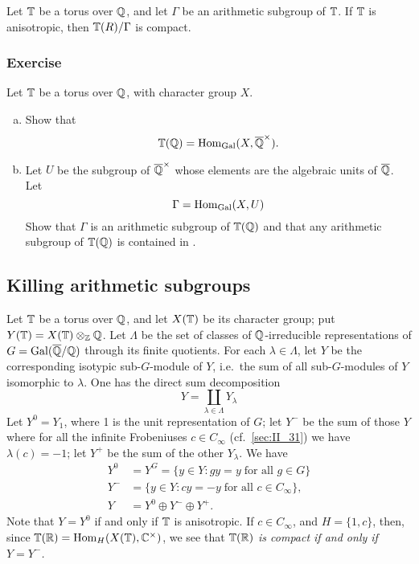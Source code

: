 \begin{subappendices}
\begin{cor}
Let $\mathbb{T}$ be a torus over $\mathbb{Q}$, and let $\Gamma$ be an arithmetic subgroup of
$\mathbb{T}$. If $\mathbb{T}$ is anisotropic, then $\mathbb{T}(R)/\Gamma$ is compact.
\end{cor}

\subsubsection*{Exercise}
\dpage
Let $\mathbb{T}$ be a torus over $\mathbb{Q}$, with character group $X$.
\begin{enumerate}[a)]
\item Show that
	\[
		\mathbb{T}(\mathbb{Q}) = \operatorname{Hom}_{\operatorname{Gal}} (X, \overline{\mathbb{Q}}^\times).
	\]
\item Let $U$ be the subgroup of $\overline{\mathbb{Q}}^\times$ whose elements are the 
algebraic units of $\overline{\mathbb{Q}}$. Let
\[
	\Gamma = \operatorname{Hom}_{\operatorname{Gal}}(X, U)
\]
Show that $\Gamma$ is an arithmetic subgroup of $\mathbb{T}(\mathbb{Q})$ and that any 
arithmetic subgroup of $\mathbb{T}(\mathbb{Q})$ is contained in \TT.
\end{enumerate}

\subsection{Killing arithmetic subgroups}
\label{sec:II_A2}
Let $\mathbb{T}$ be a torus over $\mathbb{Q}$, and let $X(\mathbb{T})$ be its character group; put
$Y(\mathbb{T}) = X(\mathbb{T}) \otimes_{\mathbb{Z}} \mathbb{Q}$. Let $\Lambda$ be the set of classes of
$\mathbb{Q}$-irreducible representations of $G = \operatorname{Gal}(\overline{\mathbb{Q}}/\mathbb{Q})$ through its finite
quotients. For each $\lambda \in \Lambda$, let $Y$ be the corresponding
isotypic sub-$G$-module of $Y$, i.e.\ the sum of all sub-$G$-modules of $Y$
isomorphic to $\lambda$. One has the direct sum decomposition
\[
	Y = \coprod_{\lambda \in \Lambda} Y_\lambda
\]
Let $Y^0 = Y_1$, where 1 is the unit representation of $G$; let $Y^-$ be the
sum of those $Y$ where for all the infinite Frobeniuses $c \in C_\infty$
(cf.\ \ref{sec:II_31}) we have $\lambda(c) = -1$; let $Y^+$ be the sum of the
other $Y_\lambda$.  We have
\dpage
\begin{align*}
	Y^0 &= Y^G = \{ y \in Y : gy = y \; \text{for all } g\in G \} \\
	Y^- &= \{ y \in Y : cy = -y \; \text{for all } c\in C_\infty \}, \\
	Y   &= Y^0 \oplus Y^- \oplus Y^+.
\end{align*}
Note that $Y = Y^0$ if and only if $\mathbb{T}$ is anisotropic.  If $c \in C_\infty$,
and $H = \{ 1, c \}$, then, since $\mathbb{T}(\mathbb{R}) = \operatorname{Hom}_H(X(\mathbb{T}),\mathbb{C}^\times)$, we see
that \emph{$\mathbb{T}(\mathbb{R})$ is compact if and only if $Y = Y^-$.}


\end{subappendices}

